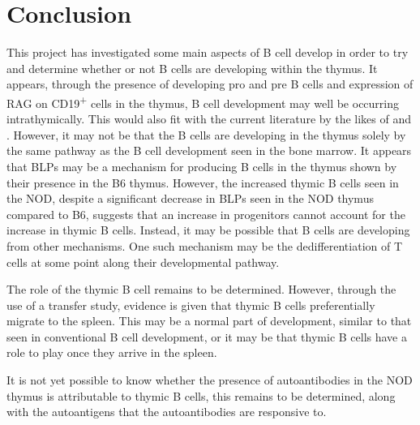 
\chapter{Conclusion}

This project has investigated some main aspects of B cell develop in order to try and determine whether or not B cells are developing within the thymus.
It appears, through the presence of developing pro and pre B cells and expression of RAG on CD19\textsuperscript{+} cells in the thymus, B cell development may well be occurring intrathymically.
This would also fit with the current literature by the likes of \citet{Akashi2000} and \citet{Perera2013}.
However, it may not be that the B cells are developing in the thymus solely by the same pathway as the B cell development seen in the bone marrow.
It appears that BLPs may be a mechanism for producing B cells in the thymus shown by their presence in the B6 thymus.
However, the increased thymic B cells seen in the NOD, despite a significant decrease in BLPs seen in the NOD thymus compared to B6, suggests that an increase in progenitors cannot account for the increase in thymic B cells.
Instead, it may be possible that B cells are developing from other mechanisms.
One such mechanism may be the dedifferentiation of T cells at some point along their developmental pathway.

The role of the thymic B cell remains to be determined.
However, through the use of a transfer study, evidence is given that thymic B cells preferentially migrate to the spleen.
This may be a normal part of development, similar to that seen in conventional B cell development, or it may be that thymic B cells have a role to play once they arrive in the spleen.

It is not yet possible to know whether the presence of autoantibodies in the NOD thymus is attributable to thymic B cells, this remains to be determined, along with the autoantigens that the autoantibodies are responsive to.



